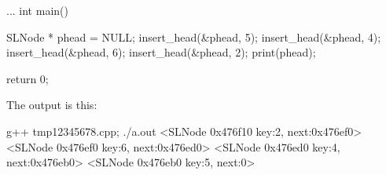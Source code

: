 \begin{console}[frame=single, , commandchars=~!@]
...
int main()
{
    SLNode * phead = NULL;
    insert_head(&phead, 5);
    insert_head(&phead, 4);
    insert_head(&phead, 6);
    insert_head(&phead, 2);
    print(phead);
    
    return 0;
}
\end{console}

The output is this:
\begin{console} g++ tmp12345678.cpp; ./a.out
<SLNode 0x476f10 key:2, next:0x476ef0>
<SLNode 0x476ef0 key:6, next:0x476ed0>
<SLNode 0x476ed0 key:4, next:0x476eb0>
<SLNode 0x476eb0 key:5, next:0>
\end{console}

